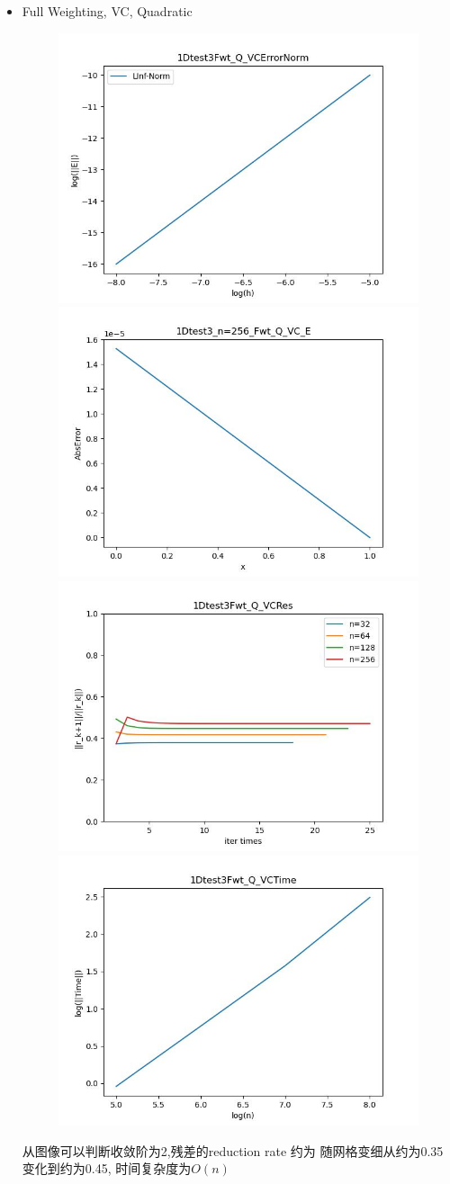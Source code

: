\documentclass{article}
\begin{document}
\begin{itemize}
    \item Full Weighting, VC, Quadratic
    \begin{figure}[h]
        \centering
        \includegraphics[width=0.35\linewidth]{1Dtest3Fwt_Q_VCErrorNorm.jpg}
        \includegraphics[width=0.35\linewidth]{1Dtest3_n=256_Fwt_Q_VC_E.jpg}
        \includegraphics[width=0.35\linewidth]{1Dtest3Fwt_Q_VCRes.jpg}
        \includegraphics[width=0.35\linewidth]{1Dtest3Fwt_Q_VCTime.jpg}
    \end{figure}
    
    从图像可以判断收敛阶为2,残差的reduction rate 约为 随网格变细从约为0.35变化到约为0.45, 时间复杂度为$O(n)$


\end{itemize}
\end{document}
